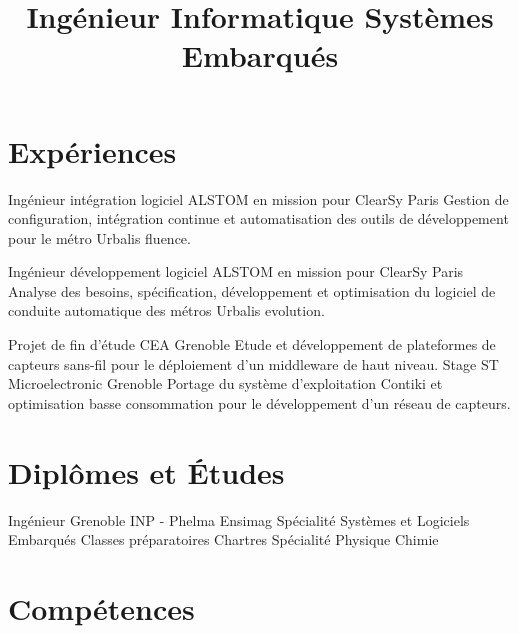 \documentclass[10pt,a4paper]{moderncv}
\title{\large Ingénieur Informatique Systèmes Embarqués}
\begin{document}
\maketitle

\section{Expériences}

  {Ingénieur intégration logiciel}
  {ALSTOM en mission pour ClearSy}
  {}
  {Paris}
  {Gestion de configuration, intégration continue et automatisation des outils de développement pour le métro Urbalis fluence.\newline{}}

  {Ingénieur développement logiciel}
  {ALSTOM en mission pour ClearSy}
  {}
  {Paris}
  {Analyse des besoins, spécification, développement et optimisation du logiciel de conduite automatique des métros Urbalis evolution.\newline{}}

  {Projet de fin d'étude}
  {CEA}
  {}
  {Grenoble}
  {Etude et développement de plateformes de capteurs sans-fil pour le déploiement d'un middleware de haut niveau.\newline{}}
  {Stage}
  {ST Microelectronic}
  {}
  {Grenoble}
  {Portage du système d'exploitation Contiki et optimisation basse consommation pour le développement d'un réseau de capteurs.\newline{}}

\section{Diplômes et Études}
  {Ingénieur Grenoble INP - Phelma Ensimag}
  {}
  {}
  {}
  {Spécialité Systèmes et Logiciels Embarqués\newline{}}
  {Classes préparatoires}
  {}
  {}
  {Chartres}
  {Spécialité Physique Chimie\newline{}}

\section{Compétences}
\end{document}
